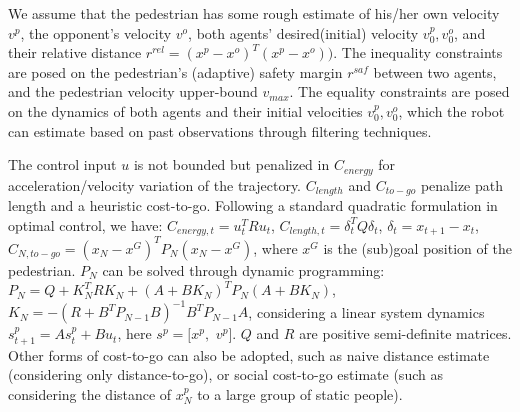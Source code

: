 \documentclass[conference]{IEEEtran}
\begin{document}
We assume that the pedestrian has some rough estimate of 
his/her own velocity $v^p$, the opponent's velocity $v^o$, both agents' 
desired(initial) velocity $v^p_0, v^o_0$, and their relative distance 
$r^{rel} = (x^p-x^o)^T(x^p-x^o))$.
The inequality constraints are posed on the pedestrian's (adaptive) safety margin 
$r^{saf}$ between two 
agents, and the pedestrian velocity upper-bound $v_{max}$. 
The equality constraints are posed on the 
dynamics of both agents and their initial velocities 
$v^p_0, v^o_0$, which the robot can estimate based on past 
observations through filtering techniques. 

The control input $u$ is not bounded but 
penalized in $C_{energy}$ for acceleration/velocity variation of the trajectory. 
$C_{length}$ and $C_{to-go}$ penalize path length and a heuristic cost-to-go. 
Following a standard quadratic formulation in optimal control, we have: $C_{energy,t}=u_t^TRu_t$, 
$C_{length,t}=\delta_t^TQ\delta_t$, $\delta_t = x_{t+1}-x_t$, 
$C_{N,to-go} = (x_N-x^G)^TP_N(x_N-x^G)$, where $x^G$ is the (sub)goal 
position of the pedestrian. $P_N$ can be solved through dynamic programming:
$P_N = Q + K_N^TRK_N + (A+BK_N)^TP_N(A+BK_N)$, 
$K_N = -(R+B^TP_{N-1}B)^{-1}B^TP_{N-1}A$, considering a linear system dynamics
$s^p_{t+1}= As^p_t+Bu_t$, here $s^p = [x^p,$ $v^p]$. $Q$ and $R$ are positive 
semi-definite matrices. Other forms of cost-to-go can also be adopted, such as 
naive distance estimate (considering only distance-to-go), or social 
cost-to-go estimate (such as considering the distance of $x^p_N$
to a large group 
of static people).
\end{document}
